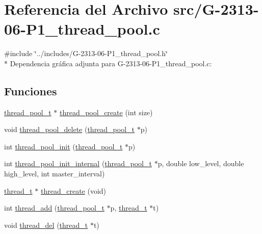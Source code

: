 \hypertarget{G-2313-06-P1__thread__pool_8c}{}\section{Referencia del Archivo src/\+G-\/2313-\/06-\/\+P1\+\_\+thread\+\_\+pool.c}
\label{G-2313-06-P1__thread__pool_8c}
{\ttfamily \#include \char`\"{}../includes/\+G-\/2313-\/06-\/\+P1\+\_\+thread\+\_\+pool.\+h\char`\"{}}\\*
Dependencia gráfica adjunta para G-\/2313-\/06-\/\+P1\+\_\+thread\+\_\+pool.c\+:
\subsection*{Funciones}
\begin{DoxyCompactItemize}
\item 
\hyperlink{structthread__pool__t}{thread\+\_\+pool\+\_\+t} $\ast$ \hyperlink{G-2313-06-P1__thread__pool_8c_ae4c7364510f378011559c4eb6078e3ea}{thread\+\_\+pool\+\_\+create} (int size)
\item 
void \hyperlink{G-2313-06-P1__thread__pool_8c_a46b14e66a9466a68fa4f67a2e08e81fd}{thread\+\_\+pool\+\_\+delete} (\hyperlink{structthread__pool__t}{thread\+\_\+pool\+\_\+t} $\ast$p)
\item 
int \hyperlink{G-2313-06-P1__thread__pool_8c_a46e84068eca615afa66b5544ea7a2518}{thread\+\_\+pool\+\_\+init} (\hyperlink{structthread__pool__t}{thread\+\_\+pool\+\_\+t} $\ast$p)
\item 
int \hyperlink{G-2313-06-P1__thread__pool_8c_ae2a8c98f4f014e5b9d632bb678d7127a}{thread\+\_\+pool\+\_\+init\+\_\+internal} (\hyperlink{structthread__pool__t}{thread\+\_\+pool\+\_\+t} $\ast$p, double low\+\_\+level, double high\+\_\+level, int master\+\_\+interval)
\item 
\hyperlink{structthread__t}{thread\+\_\+t} $\ast$ \hyperlink{G-2313-06-P1__thread__pool_8c_a920e51bce81dfc069372dd87935db55e}{thread\+\_\+create} (void)
\item 
int \hyperlink{G-2313-06-P1__thread__pool_8c_a9aa2b7b210972e06e1a7d0775ba520b3}{thread\+\_\+add} (\hyperlink{structthread__pool__t}{thread\+\_\+pool\+\_\+t} $\ast$p, \hyperlink{structthread__t}{thread\+\_\+t} $\ast$t)
\item 
void \hyperlink{G-2313-06-P1__thread__pool_8c_a95970a6ee2f49963fc3fe7aefa677194}{thread\+\_\+del} (\hyperlink{structthread__t}{thread\+\_\+t} $\ast$t)
\item 

\end{DoxyCompactItemize}
